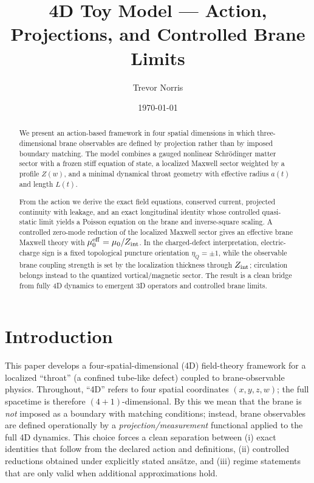 \documentclass[11pt]{article}
\title{4D Toy Model --- Action, Projections, and Controlled Brane Limits}
\author{Trevor Norris}
\date{\today}
\begin{document}
\maketitle

\begin{abstract}
We present an action-based framework in four spatial dimensions in which three-dimensional brane observables are defined by projection rather than by imposed boundary matching. The model combines a gauged nonlinear Schr\"odinger matter sector with a frozen stiff equation of state, a localized Maxwell sector weighted by a profile \(Z(w)\), and a minimal dynamical throat geometry with effective radius \(a(t)\) and length \(L(t)\).

From the action we derive the exact field equations, conserved current, projected continuity with leakage, and an exact longitudinal identity whose controlled quasi-static limit yields a Poisson equation on the brane and inverse-square scaling. A controlled zero-mode reduction of the localized Maxwell sector gives an effective brane Maxwell theory with \(\mu_0^{\rm eff}=\mu_0/Z_{\rm int}\). In the charged-defect interpretation, electric-charge sign is a fixed topological puncture orientation \(\eta_Q=\pm1\), while the observable brane coupling strength is set by the localization thickness through \(Z_{\rm int}\); circulation belongs instead to the quantized vortical/magnetic sector. The result is a clean bridge from fully 4D dynamics to emergent 3D operators and controlled brane limits.
\end{abstract}

\section{Introduction}
\label{sec:intro}

This paper develops a four-spatial-dimensional (4D) field-theory framework for a localized ``throat'' (a confined tube-like defect) coupled to brane-observable physics. Throughout, ``4D'' refers to four spatial coordinates $(x,y,z,w)$; the full spacetime is therefore $(4+1)$-dimensional. By this we mean that the brane is \emph{not} imposed as a boundary with matching conditions; instead, brane observables are defined operationally by a \emph{projection/measurement} functional applied to the full 4D dynamics. This choice forces a clean separation between (i) exact identities that follow from the declared action and definitions, (ii) controlled reductions obtained under explicitly stated ans\"atze, and (iii) regime statements that are only valid when additional approximations hold.
\end{document}
